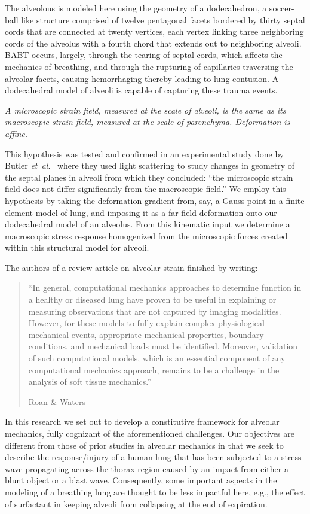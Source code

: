 The alveolous is modeled here using the geometry of a dodecahedron, a soccer-ball like structure comprised of twelve pentagonal facets bordered by thirty septal cords that are connected at twenty vertices, each vertex linking three neighboring cords of the alveolus with a fourth chord that extends out to neighboring alveoli.  BABT occurs, largely, through the tearing of septal cords, which affects the mechanics of breathing, and through the rupturing of capillaries traversing the alveolar facets, causing hemorrhaging thereby leading to lung contusion.  A dodecahedral model of alveoli is capable of capturing these trauma events.

\conjecture\label{conjecture}
\textit{A micro\-scopic strain field, measured at the scale of alveoli, is the same as its macro\-scopic strain field, measured at the scale of parenchyma.  Deformation is affine.}  

\medskip
This hypothesis was tested and confirmed in an experimental study done by Butler \textit{et~al}.\ \cite{Butleretal96} where they used light scattering to study changes in geometry of the septal planes in alveoli from which they concluded: ``the micro\-scopic strain field does not differ significantly from the macro\-scopic field.''  We employ this hypothesis by taking the deformation gradient from, say, a Gauss point in a finite element model of lung, and imposing it as a far-field deformation onto our dodecahedral model of an alveolus.  From this kinematic input we determine a macro\-scopic stress response homogenized from the micro\-scopic forces created within this structural model for alveoli.

The authors of a review article on alveolar strain finished by writing:
\begin{quotation}
    \noindent\small ``In general, computational mechanics approaches to determine function in a healthy or diseased lung have proven to be useful in explaining or measuring observations that are not captured by imaging modalities. However, for these models to fully explain complex physiological mechanical events, appropriate mechanical properties, boundary conditions, and mechanical loads must be identified. Moreover, validation of such computational models, which is an essential component of any computational mechanics approach, remains to be a challenge in the analysis of soft tissue mechanics.''
    
    \nopagebreak
    \mbox{} \hfill Roan \& Waters \cite[pg.~L633]{RoanWaters11} \normalsize
\end{quotation}
In this research we set out to develop a constitutive framework for alveolar mechanics, fully cognizant of the aforementioned challenges.  Our objectives are different from those of prior studies in alveolar mechanics in that we seek to describe the response\slash injury of a human lung that has been subjected to a stress wave propagating across the thorax region caused by an impact from either a blunt object or a blast wave.  Consequently, some important aspects in the modeling of a breathing lung are thought to be less impactful here, e.g., the effect of surfactant in keeping alveoli from collapsing at the end of expiration.

